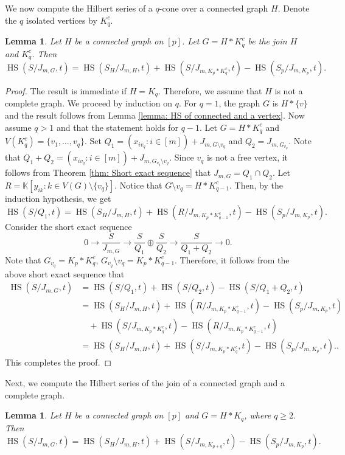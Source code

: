 \documentclass[12pt,reqno]{amsart}
\newcommand \hs{\operatorname{HS}}
\newcommand \K{\mathbb{K}}
\theoremstyle{plain}
\newtheorem{lemma}[theorem]{Lemma}
\theoremstyle{definition}
\begin{document}
 We now compute the Hilbert series of a $q$-cone over a connected graph $H$. Denote the $q$ isolated vertices by $K_q^c$.
 \begin{lemma}\label{lemma: hs of join of connected graph and isolated vertices}
     Let $H$ be a connected graph on $[p]$. Let $G=H*K_q^c$ be the join $H$ and $K_q^c$. Then $$\hs(S/J_{m,G},t)=\hs(S_H/J_{m,H},t)+\hs(S/J_{m,K_p*K_q^c},t)-\hs(S_p/J_{m,K_p},t).$$
 \end{lemma}
 \begin{proof}
 The result is immediate if $H=K_q$. Therefore, we assume that $H$ is not a complete graph.
     We proceed by induction on $q$. For $q=1$, the graph $G$ is $H*\{v\}$ and the result follows from Lemma \ref{lemma: HS of connected and a vertex}. Now assume $q>1$ and that the statement holds for $q-1$. Let $G=H*K_q^c$ and $V(K_q^c)=\{v_1,\ldots,v_q\}$. Set $Q_1=(x_{iv_q}:i\in [m])+J_{m,G\setminus {v_q}}$ and $Q_2=J_{m,G_{v_q}}$. Note that $Q_1+Q_2=(x_{iv_q}:i\in [m])+J_{m,G_{v_q}\setminus {v_q}}$. Since $v_q$ is not a free vertex, it follows from Theorem \ref{thm: Short exact sequence} that $J_{m,G}=Q_1\cap Q_2$. Let $R=\K[y_{ik}:k\in V(G)\setminus\{v_q\}]$. Notice that $G\setminus v_q=H*K_{q-1}^c$. Then, by the induction hypothesis, we get  $$\hs(S/Q_1,t)=\hs(S_H/J_{m,H},t)+\hs(R/J_{m,K_p*K_{q-1}^c},t)-\hs(S_p/J_{m,K_p},t).$$
     Consider the short exact sequence 
     \[ 0\rightarrow{\frac{S}{J_{m,G}}}\rightarrow \frac{S}{Q_1}\oplus \frac{S}{Q_2}\rightarrow \frac{S}{Q_1+Q_2}\rightarrow 0.\]
Note that $G_{v_q}=K_p*K_q^c$, $G_{v_q}\setminus v_q=K_p*K_{q-1}^c$. Therefore, it follows from the above short exact sequence that 
\begin{align*}
    \hs(S/J_{m,G},t)&=\hs(S/Q_1,t)+\hs(S/Q_2,t)-\hs(S/Q_1+Q_2,t)\\
    &=\hs(S_H/J_{m,H},t)+\hs(R/J_{m,K_p*K_{q-1}^c},t)-\hs(S_p/J_{m,K_p},t)\\
    &\quad +\hs(S/J_{m,K_p*K_q^c},t)-\hs(R/J_{m,K_p*K_{q-1}^c},t)\\
    &=\hs(S_H/J_{m,H},t)+\hs(S/J_{m,K_p*K_q^c},t)-\hs(S_p/J_{m,K_p},t)..
\end{align*}
     This completes the proof.
 \end{proof}
 Next, we compute the Hilbert series of the join of a connected graph and a complete graph.
 \begin{lemma}\label{lemma: hs of join of a connected and a complete graph}
     Let $H$ be a connected graph on $[p]$ and $G=H*K_q$, where $q\geq 2$. Then $$\hs(S/J_{m,G},t)=\hs(S_H/J_{m,H},t)+\hs(S/J_{m,K_{p+q}},t)-\hs(S_p/J_{m,K_p},t).$$
 \end{lemma}
\end{document}
